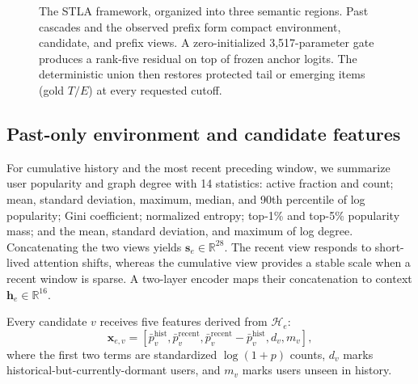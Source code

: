 \documentclass[sigconf,anonymous,review]{acmart}
\newcommand{\method}{\textsc{STLA}\xspace}
\begin{document}
\begin{figure}[t]
{\begin{tikzpicture}
\end{tikzpicture}%
}
\caption{The \method framework, organized into three semantic regions. Past cascades and the observed prefix form compact environment, candidate, and prefix views. A zero-initialized 3,517-parameter gate produces a rank-five residual on top of frozen anchor logits. The deterministic union then restores protected tail or emerging items (gold $T/E$) at every requested cutoff.}
\label{fig:pipeline}
\end{figure}

\subsection{Past-only environment and candidate features}
For cumulative history and the most recent preceding window, we summarize user popularity and graph degree with 14 statistics: active fraction and count; mean, standard deviation, maximum, median, and 90th percentile of log popularity; Gini coefficient; normalized entropy; top-1\% and top-5\% popularity mass; and the mean, standard deviation, and maximum of log degree. Concatenating the two views yields $\mathbf s_e\in\mathbb R^{28}$. The recent view responds to short-lived attention shifts, whereas the cumulative view provides a stable scale when a recent window is sparse. A two-layer encoder maps their concatenation to context $\mathbf h_e\in\mathbb R^{16}$.

Every candidate $v$ receives five features derived from $\mathcal H_e$:
\begin{equation}
\mathbf x_{e,v}=[\bar p^{\mathrm{hist}}_v,\bar p^{\mathrm{recent}}_v,
\bar p^{\mathrm{recent}}_v-\bar p^{\mathrm{hist}}_v,d_v,m_v],
\end{equation}
where the first two terms are standardized $\log(1+p)$ counts, $d_v$ marks historical-but-currently-dormant users, and $m_v$ marks users unseen in history.
\end{document}
